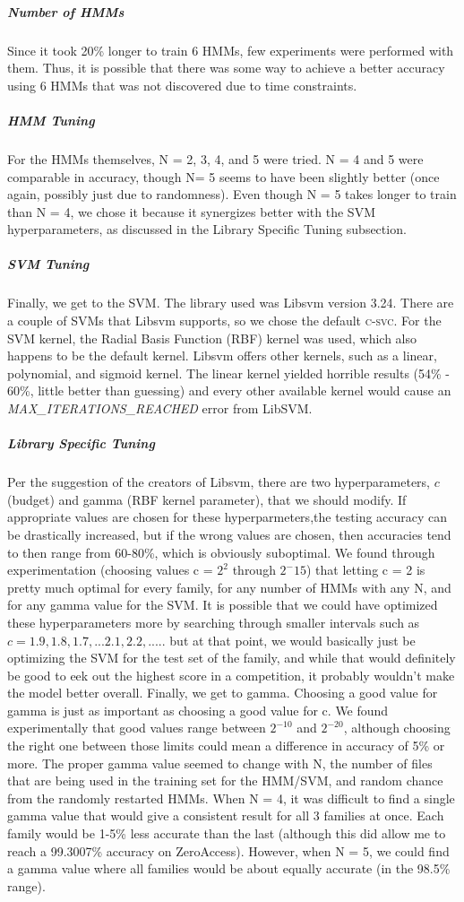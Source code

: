 \documentclass[12pt]{article}
\begin{document}
  \subparagraph{Number of HMMs}
Since it took 20\% longer to train 6 HMMs, few experiments were performed with them. Thus, it is possible that there was some way to achieve a better accuracy using 6 HMMs that was not discovered due to time constraints.
  \subparagraph{HMM Tuning}
 For the HMMs themselves, N = 2, 3, 4, and 5 were tried. N = 4 and 5 were comparable in accuracy, though N= 5 seems to have been slightly better (once again, possibly just due to randomness). Even though N = 5 takes longer to train than N = 4, we chose it because it synergizes better with the SVM hyperparameters, as discussed in the Library Specific Tuning subsection.
  \subparagraph{SVM Tuning}
  Finally, we get to the SVM. The library used was Libsvm version 3.24. There are a couple of SVMs that Libsvm supports, so we chose the default \textsc{c-svc}. For the SVM kernel, the Radial Basis Function (RBF) kernel was used, which also happens to be the default kernel. Libsvm offers other kernels, such as a linear, polynomial, and sigmoid kernel. The linear kernel yielded horrible results (54\% - 60\%, little better than guessing) and every other available kernel would cause an \textit{MAX\_ITERATIONS\_REACHED} error from LibSVM.
  \subparagraph{Library Specific Tuning}
  Per the suggestion of the creators of Libsvm, there are two hyperparameters, $c$ (budget) and gamma (RBF kernel parameter), that we should modify. If appropriate values are chosen for these hyperparmeters,the testing accuracy can be drastically increased, but if the wrong values are chosen, then accuracies tend to then range from 60-80\%, which is obviously suboptimal.  We found through experimentation (choosing values c = $2^2$ through $2^-15$) that letting c = 2 is pretty much optimal for every family, for any number of HMMs with any N, and for any gamma value for the SVM. It is possible that we could have optimized these hyperparameters more by searching through smaller intervals such as $c = 1.9, 1.8, 1.7, ... 2.1, 2.2, .....$ but at that point, we would basically just be optimizing the SVM for the test set of the family, and while that would definitely be good to eek out the highest score in a competition, it probably wouldn't make the model better overall. Finally, we get to gamma. Choosing a good value for gamma is just as important as choosing a good value for c. We found experimentally that good values range between $2^{-10}$ and $2^{-20}$, although choosing the right one between those limits could mean a difference in accuracy of 5\% or more.
The proper gamma value seemed to change with N, the number of files that are being used in the training set for the HMM/SVM, and random chance from the randomly restarted HMMs. When N = 4, it was difficult to find a single gamma value that would give a consistent result for all 3 families at once. Each family would be 1-5\% less accurate than the last (although this did allow me to reach a 99.3007\% accuracy on ZeroAccess). However, when N = 5, we could find a gamma value where all families would be about equally accurate (in the 98.5\% range). 
\end{document}
